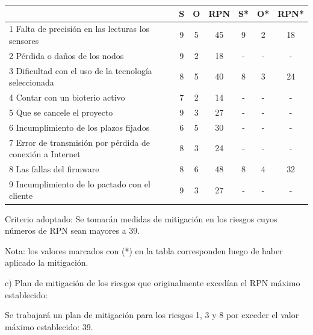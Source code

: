 \documentclass[
11pt, %
]{charter}
\begin{document}
\begin{table}[htpb]
\centering
\begin{tabular}{|l|c|c|c|c|c|c|}
\hline
\rowcolor[HTML]{C0C0C0} 
\multicolumn{1}{|c|}{\cellcolor[HTML]{C0C0C0}Riesgo} & S  & O  & RPN                        & S* & O* & RPN*                       \\ \hline
1 Falta de precisión en las lecturas los sensores & 9  & 5  & 
\cellcolor[HTML]{CB0000}45 & 9  & 2  & 
\cellcolor[HTML]{009901}18  \\ \hline
2 Pérdida o daños de los nodos & 9 & 2 & 
\cellcolor[HTML]{009901}18 & - & - & - \\ \hline
3 Dificultad con el uso de la tecnología seleccionada  &8    &5    & 
\cellcolor[HTML]{CB0000}40 & 8 & 3 & 
\cellcolor[HTML]{009901}24 \\ \hline
4 Contar con un bioterio activo &7    &2    &
\cellcolor[HTML]{009901}14 & - & - & - \\ \hline
5 Que se cancele el proyecto &9 &3 &
\cellcolor[HTML]{009901}27 &- &- &- \\ \hline
6 Incumplimiento de los plazos fijados &6 &5 &
\cellcolor[HTML]{009901}30 &- &- &- \\ \hline
7 Error de transmisión por pérdida de conexión a Internet &8 &3 &
\cellcolor[HTML]{009901}24 &- &- &-\\ \hline
8 Las fallas del firmware &8 &6 & 
\cellcolor[HTML]{CB0000}48 &8 &4 &
\cellcolor[HTML]{009901}32 \\ \hline
9 Incumplimiento de lo pactado con el cliente &9 &3 &
\cellcolor[HTML]{009901}27 &- &- &- \\ \hline
\end{tabular}
\end{table}

Criterio adoptado: 
Se tomarán medidas de mitigación en los riesgos cuyos números de RPN sean mayores a 39.

Nota: los valores marcados con (*) en la tabla corresponden luego de haber aplicado la mitigación.

c) Plan de mitigación de los riesgos que originalmente excedían el RPN máximo establecido:

Se trabajará un plan de mitigación para los riesgos 1, 3 y 8 por exceder el valor máximo establecido: 39.
 
\end{document}
